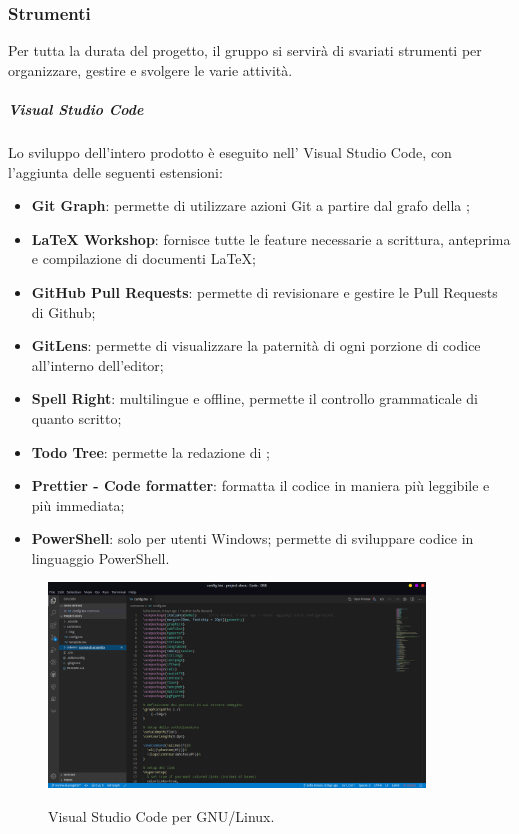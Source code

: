 \documentclass[../norme-di-progetto.tex]{subfiles}
\begin{document}
\subsubsection{Strumenti}
Per tutta la durata del progetto, il gruppo si servirà di svariati strumenti per organizzare, gestire e svolgere le varie attività.
\subparagraph{Visual Studio Code}
Lo sviluppo dell'intero prodotto è eseguito nell' Visual Studio Code, con l'aggiunta delle seguenti estensioni:
\begin{itemize}
  \item \textbf{Git Graph}: permette di utilizzare azioni Git a partire dal grafo della ;
  \item \textbf{LaTeX Workshop}: fornisce tutte le feature necessarie a scrittura, anteprima e compilazione di documenti \LaTeX;
  \item \textbf{GitHub Pull Requests}: permette di revisionare e gestire le Pull Requests di Github;
  \item \textbf{GitLens}: permette di visualizzare la paternità di ogni porzione di codice all'interno dell'editor;
  \item \textbf{Spell Right}:  multilingue e offline, permette il controllo grammaticale di quanto scritto;
  \item \textbf{Todo Tree}: permette la redazione di ;
  \item \textbf{Prettier - Code formatter}: formatta il codice in maniera più leggibile e più immediata;
  \item \textbf{PowerShell}: solo per utenti Windows; permette di sviluppare codice in linguaggio PowerShell.
\end{itemize}

\begin{figure}[H]
  \centering
  \includegraphics[width=10cm]{img/vscode.png}
  \label{fig:github}
  \caption{Visual Studio Code per GNU/Linux.}
\end{figure}
\end{document}

